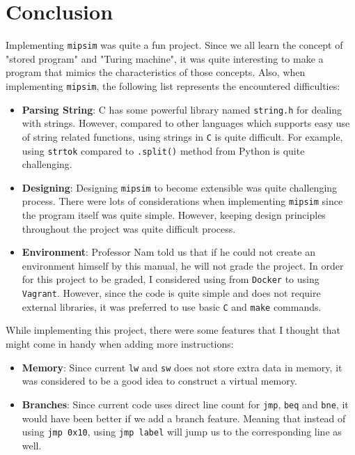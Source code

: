 \documentclass{homework}
\begin{document}
\pagebreak
\section{Conclusion}
Implementing \texttt{mipsim} was quite a fun project. Since we all learn the concept of "stored program" and "Turing machine", it was quite interesting to make a program that mimics the characteristics of those concepts. Also, when implementing \texttt{mipsim}, the following list represents the encountered difficulties:

\begin{itemize}
    \item \textbf{Parsing String}: C has some powerful library named \texttt{string.h} for dealing with strings. However, compared to other languages which supports easy use of string related functions, using strings in \texttt{C} is quite difficult. For example, using \texttt{strtok} compared to \texttt{.split()} method from Python is quite challenging. 
    \item \textbf{Designing}: Designing \texttt{mipsim} to become extensible was quite challenging process. There were lots of considerations when implementing \texttt{mipsim} since the program itself was quite simple. However, keeping design principles throughout the project was quite difficult process.
    \item \textbf{Environment}: Professor Nam told us that if he could not create an environment himself by this manual, he will not grade the project. In order for this project to be graded, I considered using from \texttt{Docker} to using \texttt{Vagrant}. However, since the code is quite simple and does not require external libraries, it was preferred to use basic \texttt{C} and \texttt{make} commands. 
\end{itemize}

While implementing this project, there were some features that I thought that might come in handy when adding more instructions:
\begin{itemize}
    \item \textbf{Memory}: Since current \texttt{lw} and \texttt{sw} does not store extra data in memory, it was considered to be a good idea to construct a virtual memory. 
    \item \textbf{Branches}: Since current code uses direct line count for \texttt{jmp}, \texttt{beq} and \texttt{bne}, it would have been better if we add a branch feature. Meaning that instead of using \texttt{jmp 0x10}, using \texttt{jmp label} will jump us to the corresponding line as well. 
\end{itemize}
\end{document}
